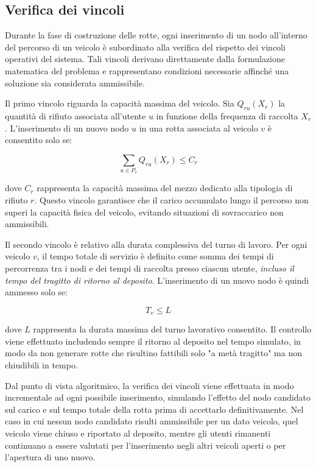 \subsection{Verifica dei vincoli}

Durante la fase di costruzione delle rotte, ogni inserimento di un nodo all'interno del percorso di un veicolo è subordinato alla verifica del rispetto dei vincoli operativi del sistema. Tali vincoli derivano direttamente dalla formulazione matematica del problema e rappresentano condizioni necessarie affinché una soluzione sia considerata ammissibile.

Il primo vincolo riguarda la capacità massima del veicolo. Sia $Q_{ru}(X_r)$ la quantità di rifiuto associata all'utente $u$ in funzione della frequenza di raccolta $X_r$. L'inserimento di un nuovo nodo $u$ in una rotta associata al veicolo $v$ è consentito solo se:

\[
\sum_{u \in P_v} Q_{ru}(X_r) \leq C_r
\]

dove $C_r$ rappresenta la capacità massima del mezzo dedicato alla tipologia di rifiuto $r$. Questo vincolo garantisce che il carico accumulato lungo il percorso non superi la capacità fisica del veicolo, evitando situazioni di sovraccarico non ammissibili.

Il secondo vincolo è relativo alla durata complessiva del turno di lavoro. Per ogni veicolo $v$, il tempo totale di servizio è definito come somma dei tempi di percorrenza tra i nodi e dei tempi di raccolta presso ciascun utente, \emph{incluso il tempo del tragitto di ritorno al deposito}. L'inserimento di un nuovo nodo è quindi ammesso solo se:

\[
T_v \leq L
\]

dove $L$ rappresenta la durata massima del turno lavorativo consentito. Il controllo viene effettuato includendo sempre il ritorno al deposito nel tempo simulato, in modo da non generare rotte che risultino fattibili solo "a metà tragitto" ma non chiudibili in tempo.

Dal punto di vista algoritmico, la verifica dei vincoli viene effettuata in modo incrementale ad ogni possibile inserimento, simulando l'effetto del nodo candidato sul carico e sul tempo totale della rotta prima di accettarlo definitivamente. Nel caso in cui nessun nodo candidato risulti ammissibile per un dato veicolo, quel veicolo viene chiuso e riportato al deposito, mentre gli utenti rimanenti continuano a essere valutati per l'inserimento negli altri veicoli aperti o per l'apertura di uno nuovo.

